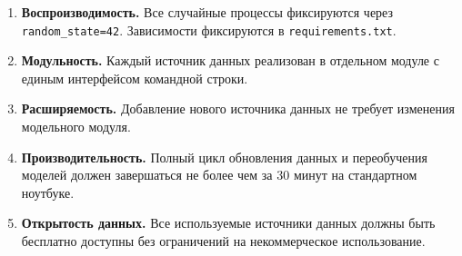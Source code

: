 \begin{enumerate}
    \item \textbf{Воспроизводимость.}
          Все случайные процессы фиксируются через \texttt{random\_state=42}.
          Зависимости фиксируются в \texttt{requirements.txt}.
    \item \textbf{Модульность.}
          Каждый источник данных реализован в отдельном модуле
          с единым интерфейсом командной строки.
    \item \textbf{Расширяемость.}
          Добавление нового источника данных не требует изменения модельного модуля.
    \item \textbf{Производительность.}
          Полный цикл обновления данных и переобучения моделей должен завершаться
          не более чем за 30 минут на стандартном ноутбуке.
    \item \textbf{Открытость данных.}
          Все используемые источники данных должны быть бесплатно доступны
          без ограничений на некоммерческое использование.
\end{enumerate}
